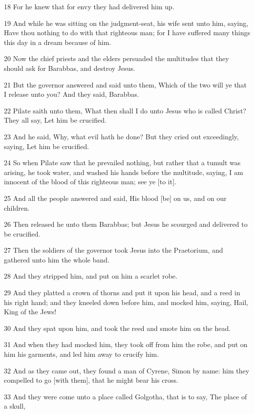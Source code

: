 \par 18 For he knew that for envy they had delivered him up.
\par 19 And while he was sitting on the judgment-seat, his wife sent unto him, saying, Have thou nothing to do with that righteous man; for I have suffered many things this day in a dream because of him.
\par 20 Now the chief priests and the elders persuaded the multitudes that they should ask for Barabbas, and destroy Jesus.
\par 21 But the governor answered and said unto them, Which of the two will ye that I release unto you? And they said, Barabbas.
\par 22 Pilate saith unto them, What then shall I do unto Jesus who is called Christ? They all say, Let him be crucified.
\par 23 And he said, Why, what evil hath he done? But they cried out exceedingly, saying, Let him be crucified.
\par 24 So when Pilate saw that he prevailed nothing, but rather that a tumult was arising, he took water, and washed his hands before the multitude, saying, I am innocent of the blood of this righteous man; see ye [to it].
\par 25 And all the people answered and said, His blood [be] on us, and on our children.
\par 26 Then released he unto them Barabbas; but Jesus he scourged and delivered to be crucified.
\par 27 Then the soldiers of the governor took Jesus into the Praetorium, and gathered unto him the whole band.
\par 28 And they stripped him, and put on him a scarlet robe.
\par 29 And they platted a crown of thorns and put it upon his head, and a reed in his right hand; and they kneeled down before him, and mocked him, saying, Hail, King of the Jews!
\par 30 And they spat upon him, and took the reed and smote him on the head.
\par 31 And when they had mocked him, they took off from him the robe, and put on him his garments, and led him away to crucify him.
\par 32 And as they came out, they found a man of Cyrene, Simon by name: him they compelled to go [with them], that he might bear his cross.
\par 33 And they were come unto a place called Golgotha, that is to say, The place of a skull,
